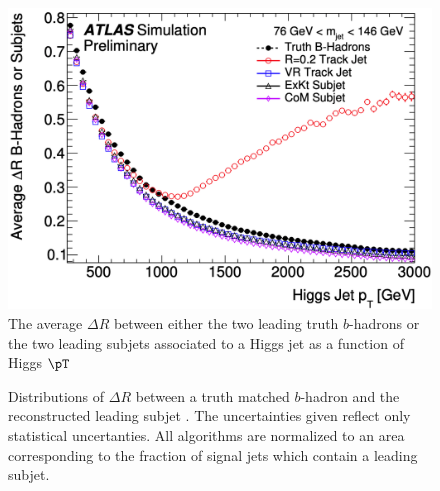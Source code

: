 \begin{figure}[!htbp]
  \centering
  \includegraphics[width=0.98\linewidth]{figures/objects/average_deltaR}

  \caption{\cite{ATL-PHYS-PUB-2017-010} The average $\Delta R$ between either
the two leading truth $b$-hadrons or the two leading subjets associated to a
Higgs jet as a function of Higgs $\pT$}
  \label{sec:objects:average_deltaR}
\end{figure}

\begin{figure}[!htbp]
  \centering
   \hfill
  \caption{Distributions of $\Delta R$ between a truth matched $b$-hadron and
the reconstructed leading subjet \cite{ATL-PHYS-PUB-2017-010}.  The
uncertainties given reflect only statistical uncertanties.  All algorithms are
normalized to an area corresponding to the fraction of signal jets which
contain a leading subjet.} 
  \label{sec:objects:leading_vr}
\end{figure}

